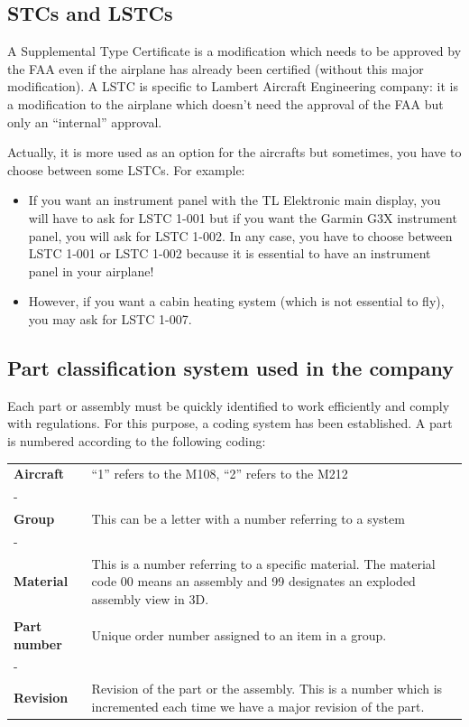 \documentclass[11pt,a4paper]{article}
\begin{document}
\subsection{STCs and LSTCs}
\label{subsec:LSTC}
A Supplemental Type Certificate is a modification which needs to be approved by the FAA even if the airplane has already been certified (without this major modification). A LSTC is specific to Lambert Aircraft Engineering company: it is a modification to the airplane which doesn't need the approval of the FAA but only an ``internal'' approval.

\bigskip

Actually, it is more used as an option for the aircrafts but sometimes, you have to choose between some LSTCs. For example:
\begin{itemize}
\item If you want an instrument panel with the TL Elektronic main display, you will have to ask for LSTC 1-001 but if you want the Garmin G3X instrument panel, you will ask for LSTC 1-002. In any case, you have to choose between LSTC 1-001 or LSTC 1-002 because it is essential to have an instrument panel in your airplane!
\item However, if you want a cabin heating system (which is not essential to fly), you may ask for LSTC 1-007.
\end{itemize}

\subsection{Part classification system used in the company}
\label{subsec:partnumber}

Each part or assembly must be quickly identified to work efficiently and comply with regulations. For this purpose, a coding system has been established. A part is numbered according to the following coding:

\begin{center}
\begin{tabular}{p{3cm} p{12cm}}
\textbf{Aircraft} & ``1'' refers to the M108, ``2'' refers to the M212 \tabularnewline
- \tabularnewline
\textbf{Group} & This can be a letter with a number referring to a system \tabularnewline
- \tabularnewline
\textbf{Material} & This is a number referring to a specific material.  The material code 00 means an assembly and 99 designates an exploded assembly view in 3D. \tabularnewline
\tabularnewline
\textbf{Part number} & Unique order number assigned to an item in a group. \tabularnewline
- \tabularnewline
\textbf{Revision} & Revision of the part or the assembly. This is a number which is incremented each time we have a major revision of the part. \tabularnewline
\end{tabular}
\end{center}
\end{document}
